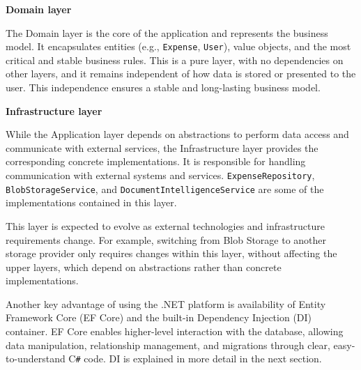 \textbf{Domain layer}

The Domain layer is the core of the application and represents the business model. It encapsulates entities (e.g., \texttt{Expense}, \texttt{User}), value objects, and the most critical and stable business rules. This is a pure layer, with no dependencies on other layers, and it remains independent of how data is stored or presented to the user. This independence ensures a stable and long-lasting business model.

\textbf{Infrastructure layer}

While the Application layer depends on abstractions to perform data access and communicate with external services, the Infrastructure layer provides the corresponding concrete implementations. It is responsible for handling communication with external systems and services. \texttt{ExpenseRepository}, \texttt{BlobStorageService}, and \texttt{DocumentIntelligenceService} are some of the implementations contained in this layer.

This layer is expected to evolve as external technologies and infrastructure requirements change. For example, switching from Blob Storage to another storage provider only requires changes within this layer, without affecting the upper layers, which depend on abstractions rather than concrete implementations.

Another key advantage of using the .NET platform is availability of Entity Framework Core (EF Core) and the built-in Dependency Injection (DI) container. EF Core enables higher-level interaction with the database, allowing data manipulation, relationship management, and migrations through clear, easy-to-understand C\texttt{\#} code. DI is explained in more detail in the next section.
